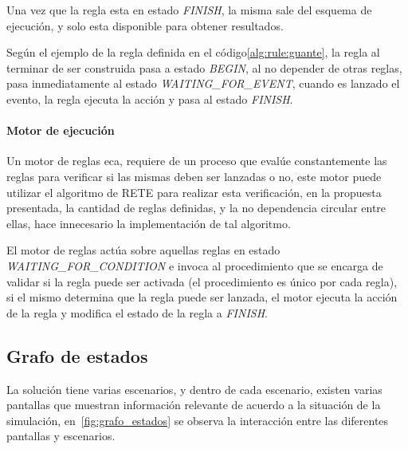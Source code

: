Una vez que la regla esta en estado \emph{FINISH}, la misma sale del esquema de
ejecución, y solo esta disponible para obtener resultados.

Según el ejemplo de la regla definida en el código\ref{alg:rule:guante}, la
regla al terminar de ser construida pasa a estado \emph{BEGIN}, al no depender
de otras reglas, pasa inmediatamente al estado \emph{WAITING\_FOR\_EVENT},
cuando es lanzado el evento, la regla ejecuta la acción y pasa al estado
\emph{FINISH}.

\paragraph{Motor de ejecución}

Un motor de reglas \gls{eca}, requiere de un proceso que evalúe constantemente
las reglas para verificar si las mismas deben ser lanzadas o
no\cite{bailey2004event}\cite{galton2002two}, este motor puede utilizar el
algoritmo de RETE\cite{de2001eca} para realizar esta verificación, en la
propuesta presentada, la cantidad de reglas definidas, y la no dependencia
circular entre ellas, hace innecesario la implementación de tal
algoritmo\cite{de2001eca}. 

El motor de reglas actúa sobre aquellas reglas en estado
\emph{WAITING\_FOR\_CONDITION} e invoca al procedimiento que se encarga de
validar si la regla puede ser activada (el procedimiento es único por cada
regla), si el mismo determina que la regla puede ser lanzada, el motor ejecuta
la acción de la regla y modifica el estado de la regla a \emph{FINISH}.


\subsection{Grafo de estados}

La solución tiene varias escenarios, y dentro de cada escenario, existen varias
pantallas que muestran información relevante de acuerdo a la situación de la
simulación, en~\ref{fig:grafo_estados} se observa la interacción entre las
diferentes pantallas y escenarios.

